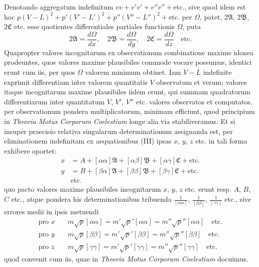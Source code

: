 \documentclass[12pt,a4paper]{book}
\begin{document}
Denotando aggregatum indefinitum $vv+v'v'+v''v''+\text{etc.}$, sive quod idem est hoc $p(V-L)^2+p'(V'-L')^2+p''(V''-L'')^2+\text{etc.}$ per $\Omega$, patet, $2\mathfrak{A}$, $2\mathfrak{B}$, $2\mathfrak{C}$ etc. esse quotientes differentiales partiales functionis $\Omega$, puta
%
\begin{equation*}
2\mathfrak{A}=\frac{d\Omega}{dx},\quad 2\mathfrak{B}=\frac{d\Omega}{dy},\quad 2\mathfrak{C}=\frac{d\Omega}{dz}\quad\text{etc.}
\end{equation*}
Quapropter valores incognitarum ex observationum combinatione maxime idonea prodeuntes, quos valores maxime plausibiles commode vocare possumus, identici erunt cum iis, per quos $\Omega$ valorem minimum obtinet. Iam $V-L$ indefinite exprimit differentiam inter valorem quantitatis $V$ observatum et verum; valores itaque incognitarum maxime plausibiles iidem erunt, qui summam quadratorum differentiarum inter quantitatum $V$, $V'$, $V''$ etc. valores observatos et computatos, per observationum pondera multiplicatorum, minimam efficiunt, quod principium in \textit{Theoria Motus Corporum Coelestium} longe alia via stabiliveramus. Et si insuper praecisio relativa singularum determinationum assignanda est, per eliminationem indefinitam ex aequationibus (III) ipsas $x$, $y$, $z$ etc. in tali forma exhibere oportet:
%
\begin{equation*}
\begin{aligned}
x &= A+[\alpha\alpha]\mathfrak{A}+[\alpha\beta]\mathfrak{B}+[\alpha\gamma]\mathfrak{C}+\text{etc.}\\
y &= B+[\beta\alpha]\mathfrak{A}+[\beta\beta]\mathfrak{B}+[\beta\gamma]\mathfrak{C}+\text{etc.}\\
&\text{etc.}
\end{aligned}\tag{VII}
\end{equation*}
quo pacto valores maxime plausibiles incognitarum $x$, $y$, $z$ etc. erunt resp. $A$, $B$, $C$ etc., atque pondera his determinationibus tribuenda $\tfrac{1}{[\alpha\alpha]}$, $\tfrac{1}{[\beta\beta]}$, $\tfrac{1}{[\gamma\gamma]}$ etc., sive errores medii in ipsis metuendi
%
\begin{align*}
\text{pro }x\quad&m\surd p[\alpha\alpha]=m'\surd p'[\alpha\alpha]=m''\surd p''[\alpha\alpha]\quad\text{etc.}\\
\text{pro }y\quad&m\surd p[\beta\beta]=m'\surd p'[\beta\beta]=m''\surd p''[\beta\beta]\quad\text{etc.}\\
\text{pro }z\quad&m\surd p[\gamma\gamma]=m'\surd p'[\gamma\gamma]=m''\surd p''[\gamma\gamma]\quad\text{etc.}
\end{align*}
quod convenit cum iis, quae in \textit{Theoria Motus Corporum Coelestium} docuimus.
\end{document}
